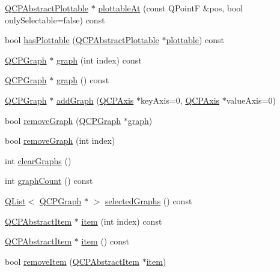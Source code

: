 \begin{DoxyCompactItemize}
\hyperlink{class_q_c_p_abstract_plottable}{Q\+C\+P\+Abstract\+Plottable} $\ast$ \hyperlink{class_q_custom_plot_acddbbd8b16dd633f0d94e5a736fbd8cf}{plottable\+At} (const Q\+PointF \&pos, bool only\+Selectable=false) const
\item 
bool \hyperlink{class_q_custom_plot_a72cefbfbb9e699940e37be605bd9c51e}{has\+Plottable} (\hyperlink{class_q_c_p_abstract_plottable}{Q\+C\+P\+Abstract\+Plottable} $\ast$\hyperlink{class_q_custom_plot_a32de81ff53e263e785b83b52ecd99d6f}{plottable}) const
\item 
\hyperlink{class_q_c_p_graph}{Q\+C\+P\+Graph} $\ast$ \hyperlink{class_q_custom_plot_a6ecae130f684b25276fb47bd3a5875c6}{graph} (int index) const
\item 
\hyperlink{class_q_c_p_graph}{Q\+C\+P\+Graph} $\ast$ \hyperlink{class_q_custom_plot_aac190865a67f19af3fdf2136774997af}{graph} () const
\item 
\hyperlink{class_q_c_p_graph}{Q\+C\+P\+Graph} $\ast$ \hyperlink{class_q_custom_plot_a6fb2873d35a8a8089842d81a70a54167}{add\+Graph} (\hyperlink{class_q_c_p_axis}{Q\+C\+P\+Axis} $\ast$key\+Axis=0, \hyperlink{class_q_c_p_axis}{Q\+C\+P\+Axis} $\ast$value\+Axis=0)
\item 
bool \hyperlink{class_q_custom_plot_a903561be895fb6528a770d66ac5e6713}{remove\+Graph} (\hyperlink{class_q_c_p_graph}{Q\+C\+P\+Graph} $\ast$\hyperlink{class_q_custom_plot_a6ecae130f684b25276fb47bd3a5875c6}{graph})
\item 
bool \hyperlink{class_q_custom_plot_a9554b3d2d5b10c0f884bd4010b6c192c}{remove\+Graph} (int index)
\item 
int \hyperlink{class_q_custom_plot_ab0f3abff2d2f7df3668b5836f39207fa}{clear\+Graphs} ()
\item 
int \hyperlink{class_q_custom_plot_a5e1787cdde868c4d3790f9ebc8207d90}{graph\+Count} () const
\item 
\hyperlink{class_q_list}{Q\+List}$<$ \hyperlink{class_q_c_p_graph}{Q\+C\+P\+Graph} $\ast$ $>$ \hyperlink{class_q_custom_plot_ad3547aded026d8a9ae6ef13a69080d06}{selected\+Graphs} () const
\item 
\hyperlink{class_q_c_p_abstract_item}{Q\+C\+P\+Abstract\+Item} $\ast$ \hyperlink{class_q_custom_plot_ac042f2e78edd228ccf2f26b7fe215239}{item} (int index) const
\item 
\hyperlink{class_q_c_p_abstract_item}{Q\+C\+P\+Abstract\+Item} $\ast$ \hyperlink{class_q_custom_plot_a12eb2a283cf10a8a9176c01c0443e83e}{item} () const
\item 
bool \hyperlink{class_q_custom_plot_ae04446557292551e8fb6e2c106e1848d}{remove\+Item} (\hyperlink{class_q_c_p_abstract_item}{Q\+C\+P\+Abstract\+Item} $\ast$\hyperlink{class_q_custom_plot_ac042f2e78edd228ccf2f26b7fe215239}{item})

\end{DoxyCompactItemize}
